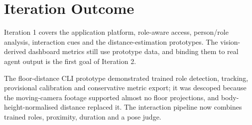 \section{Iteration Outcome}
Iteration 1 covers the application platform, role-aware access, person/role analysis, interaction cues and the distance-estimation prototypes. The vision-derived dashboard metrics still use prototype data, and binding them to real agent output is the first goal of Iteration 2.

The floor-distance CLI prototype demonstrated trained role detection, tracking, provisional calibration and conservative metric export; it was descoped because the moving-camera footage supported almost no floor projections, and body-height-normalised distance replaced it. The interaction pipeline now combines trained roles, proximity, duration and a pose judge.
